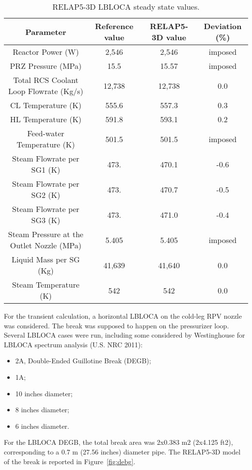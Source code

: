 \begin{table}
  \centering
  \begin{tabular}{c | c | c | c} 
    \hline 
     Parameter & Reference value & RELAP5-3D value & Deviation (\%) \\
    \hline 
     Reactor Power (W) & 2,546 & 2,546 & imposed \\
     PRZ Pressure (MPa) & 15.5 & 15.57 & imposed \\
     Total RCS Coolant Loop Flowrate (Kg/s) & 12,738 & 12,738 & 0.0 \\
     CL Temperature (K) & 555.6 & 557.3 & 0.3 \\
     HL Temperature (K) & 591.8 & 593.1 & 0.2 \\
     Feed-water Temperature (K) & 501.5 & 501.5 & imposed \\
     Steam Flowrate per SG1 (K) & 473. & 470.1 & -0.6 \\
     Steam Flowrate per SG2 (K) & 473. & 470.7 & -0.5 \\
     Steam Flowrate per SG3 (K) & 473. & 471.0 & -0.4 \\
     Steam Pressure at the Outlet Nozzle (MPa) & 5.405 & 5.405 & imposed \\
     Liquid Mass per SG (Kg) & 41,639 & 41,640 & 0.0 \\
     Steam Temperature (K) & 542 & 542 & 0.0 \\
    \hline 
  \end{tabular}
  \caption{RELAP5-3D LBLOCA steady state values.}
  \label{tab:dataRelap5}
\end{table}

For the transient calculation, a horizontal LBLOCA on the cold-leg RPV nozzle was considered. The break was supposed to happen on the pressurizer loop. Several LBLOCA cases were run, including some considered by Westinghouse for LBLOCA spectrum analysis (U.S. NRC 2011):
\begin{itemize}
	\item 2A, Double-Ended Guillotine Break (DEGB);
	\item 1A;
	\item 10 inches diameter;
	\item 8 inches diameter;
	\item 6 inches diameter.
\end{itemize}

For the LBLOCA DEGB, the total break area was 2x0.383 m2 (2x4.125 ft2), corresponding to a 0.7 m (27.56 inches) diameter pipe. The RELAP5-3D model of the break is reported in Figure~\ref{fig:debg}. 

